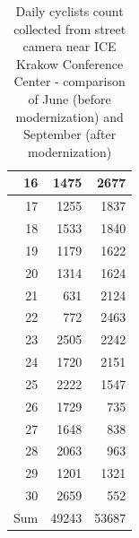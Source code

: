 \begin{table}[]
\begin{tabular}{|r|r|r|}
16                                     & 1475                      & 2677                           \\ \hline
17                                     & 1255                      & 1837                           \\ \hline
18                                     & 1533                      & 1840                           \\ \hline
19                                     & 1179                      & 1622                           \\ \hline
20                                     & 1314                      & 1624                           \\ \hline
21                                     & 631                       & 2124                           \\ \hline
22                                     & 772                       & 2463                           \\ \hline
23                                     & 2505                      & 2242                           \\ \hline
24                                     & 1720                      & 2151                           \\ \hline
25                                     & 2222                      & 1547                           \\ \hline
26                                     & 1729                      & 735                            \\ \hline
27                                     & 1648                      & 838                            \\ \hline
28                                     & 2063                      & 963                            \\ \hline
29                                     & 1201                      & 1321                           \\ \hline
30                                     & 2659                      & 552                            \\ \hline
\multicolumn{1}{|l|}{Sum}              & 49243                     & 53687                          \\ \hline
\end{tabular}
\caption{Daily cyclists count collected from street camera near ICE Krakow Conference Center - comparison of June (before modernization) and September (after modernization)}
\label{tab:j-s}
\end{table}

